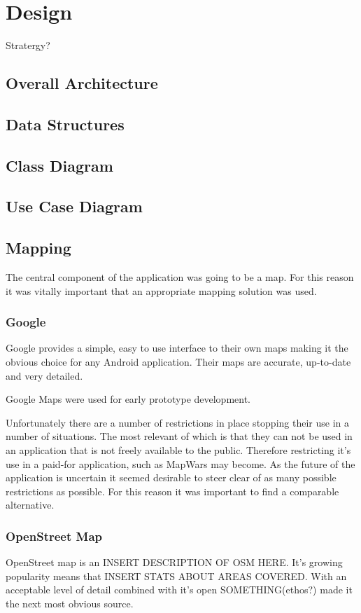 \chapter{Design}
Stratergy?


\section{Overall Architecture}


\section{Data Structures}
\section{Class Diagram}
\section{Use Case Diagram}



\section{Mapping}
The central component of the application was going to be a map. For this reason it was vitally important that an appropriate mapping solution was used.

\subsection{Google}
Google provides a simple, easy to use interface to their own maps making it the obvious choice for any Android application. Their maps are accurate, up-to-date and very detailed.

Google Maps were used for early prototype development.

Unfortunately there are a number of restrictions in place stopping their use in a number of situations. The most relevant of which is that they can not be used in an application that is not freely available to the public. Therefore restricting it's use in a paid-for application, such as MapWars may become. As the future of the application is uncertain it seemed desirable to steer clear of as many possible restrictions as possible. For this reason it was important to find a comparable alternative.

\subsection{OpenStreet Map}
OpenStreet map is an INSERT DESCRIPTION OF OSM HERE. It's growing popularity means that INSERT STATS ABOUT AREAS COVERED. With an acceptable level of detail combined with it's open SOMETHING(ethos?) made it the next most obvious source.


